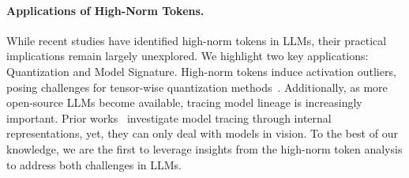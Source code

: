 \paragraph{Applications of High-Norm Tokens.}
While recent studies have identified high-norm tokens in LLMs, their practical implications remain largely unexplored. We highlight two key applications: Quantization and Model Signature.
High-norm tokens induce activation outliers, posing challenges for tensor-wise quantization methods~\cite{dettmers2022gpt3, xiao2023smoothquant, grattafiori2024llama}.
Additionally, as more open-source LLMs become available, tracing model lineage is increasingly important.
Prior works~\cite{yu2024neural, mu2023model} investigate model tracing through internal representations, yet, they can only deal with models in vision.
To the best of our knowledge, we are the first to leverage insights from the high-norm token analysis to address both challenges in LLMs.
